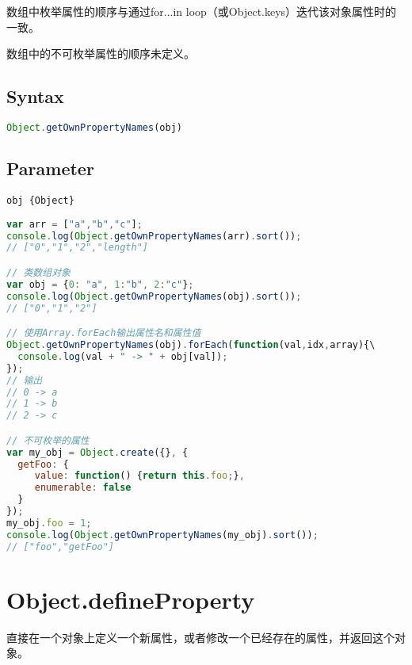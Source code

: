 \begin{compactitem}
\item 数组中枚举属性的顺序与通过for...in loop（或Object.keys）迭代该对象属性时的一致。
\item 数组中的不可枚举属性的顺序未定义。
\end{compactitem}

\subsection{Syntax}



\begin{lstlisting}[language=JavaScript]
Object.getOwnPropertyNames(obj)
\end{lstlisting}


\subsection{Parameter}


\begin{compactitem}
\item \texttt{obj \{Object\}}
\end{compactitem}



\begin{lstlisting}[language=JavaScript]
var arr = ["a","b","c"];
console.log(Object.getOwnPropertyNames(arr).sort()); 
// ["0","1","2","length"]

// 类数组对象
var obj = {0: "a", 1:"b", 2:"c"};
console.log(Object.getOwnPropertyNames(obj).sort());
// ["0","1","2"]

// 使用Array.forEach输出属性名和属性值
Object.getOwnPropertyNames(obj).forEach(function(val,idx,array){\
  console.log(val + " -> " + obj[val]);
});
// 输出
// 0 -> a
// 1 -> b
// 2 -> c

// 不可枚举的属性
var my_obj = Object.create({}, {
  getFoo: {
     value: function() {return this.foo;},
     enumerable: false
  }
});
my_obj.foo = 1;
console.log(Object.getOwnPropertyNames(my_obj).sort()); 
// ["foo","getFoo"]
\end{lstlisting}


\section{Object.defineProperty}

直接在一个对象上定义一个新属性，或者修改一个已经存在的属性，并返回这个对象。

